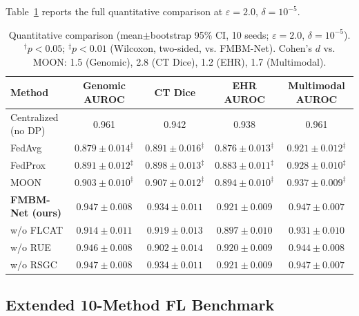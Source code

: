 \documentclass{ieeeaccess}
\begin{document}
Table~\ref{tab:results} reports the full quantitative comparison at
$\varepsilon\!=\!2.0$, $\delta\!=\!10^{-5}$.

\begin{table}[!t]
\renewcommand{\arraystretch}{1.30}
\caption{Quantitative comparison (mean$\pm$bootstrap 95\% CI, 10 seeds;
$\varepsilon\!=\!2.0$, $\delta\!=\!10^{-5}$). $^\dagger p<0.05$;
$^\ddagger p<0.01$ (Wilcoxon, two-sided, vs. FMBM-Net). Cohen's $d$
vs. MOON: 1.5 (Genomic), 2.8 (CT Dice), 1.2 (EHR), 1.7 (Multimodal).}
\label{tab:results}
\centering
\renewcommand{\arraystretch}{1.2}
\begin{tabular}{lcccc}
\toprule
\multirow{2}{*}{\textbf{Method}} &
  \textbf{Genomic AUROC} & \textbf{CT Dice} &
  \textbf{EHR AUROC} & \textbf{Multimodal AUROC}\\
\midrule
Centralized (no DP) & 0.961 & 0.942 & 0.938 & 0.961\\
\midrule
FedAvg \cite{mcmahan2017}
  & $0.879\!\pm\!0.014^\ddagger$
  & $0.891\!\pm\!0.016^\ddagger$
  & $0.876\!\pm\!0.013^\ddagger$
  & $0.921\!\pm\!0.012^\ddagger$\\
FedProx \cite{li2020fedprox}
  & $0.891\!\pm\!0.012^\ddagger$
  & $0.898\!\pm\!0.013^\ddagger$
  & $0.883\!\pm\!0.011^\ddagger$
  & $0.928\!\pm\!0.010^\ddagger$\\
MOON \cite{li2021moon}
  & $0.903\!\pm\!0.010^\ddagger$
  & $0.907\!\pm\!0.012^\ddagger$
  & $0.894\!\pm\!0.010^\ddagger$
  & $0.937\!\pm\!0.009^\ddagger$\\
\midrule
\textbf{FMBM-Net (ours)}
  & $\mathbf{0.947\!\pm\!0.008}$
  & $\mathbf{0.934\!\pm\!0.011}$
  & $\mathbf{0.921\!\pm\!0.009}$
  & $\mathbf{0.947\!\pm\!0.007}$\\
\quad w/o FLCAT
  & $0.914\!\pm\!0.011$
  & $0.919\!\pm\!0.013$
  & $0.897\!\pm\!0.010$
  & $0.931\!\pm\!0.010$\\
\quad w/o RUE
  & $0.946\!\pm\!0.008$
  & $0.902\!\pm\!0.014$
  & $0.920\!\pm\!0.009$
  & $0.944\!\pm\!0.008$\\
\quad w/o RSGC
  & $0.947\!\pm\!0.008$
  & $0.934\!\pm\!0.011$
  & $0.921\!\pm\!0.009$
  & $0.947\!\pm\!0.007$\\
\bottomrule
\end{tabular}
\end{table}

\subsection{Extended 10-Method FL Benchmark}
\end{document}
